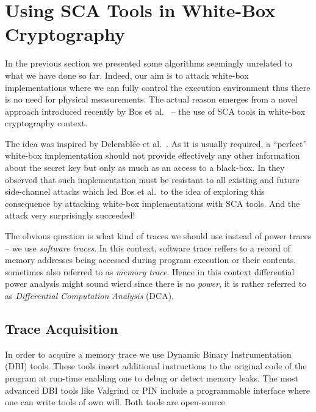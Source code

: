 \section{Using SCA Tools in White-Box Cryptography}
\label{sec:scawbc}

In the previous section we presented some algorithms seemingly unrelated to what we have done so far. Indeed, our aim is to attack white-box implementations where we can fully control the execution environment thus there is no need for physical measurements. The actual reason emerges from a novel approach introduced recently by Bos et al.\ \cite{bos2015differential} -- the use of SCA tools in white-box cryptography context.

The idea was inspired by Delerabl{\'e}e et al.\ \cite{delerablee2013white}. As it is usually required, a ``perfect'' white-box implementation should not provide effectively any other information about the secret key but only as much as an access to a black-box. In \cite{delerablee2013white} they observed that such implementation must be resistant to all existing and future side-channel attacks which led Bos et al.\ to the idea of exploring this consequence by attacking white-box implementations with SCA tools. And the attack very surprisingly succeeded!

The obvious question is what kind of traces we should use instead of power traces -- we use {\em software traces}. In this context, software trace reffers to a record of memory addresses being accessed during program execution or their contents, sometimes also referred to as {\em memory trace}. Hence in this context differential power analysis might sound wierd since there is no {\em power}, it is rather referred to as {\em Differential Computation Analysis} (DCA).



\subsection{Trace Acquisition}
\label{sec:tracq}

In order to acquire a memory trace we use Dynamic Binary Instrumentation (DBI) tools. These tools insert additional instructions to the original code of the program at run-time enabling one to debug or detect memory leaks. The most advanced DBI tools like Valgrind \cite{nethercote2007valgrind} or PIN \cite{luk2005pin} include a programmable interface where one can write tools of own will. Both tools are open-source.

